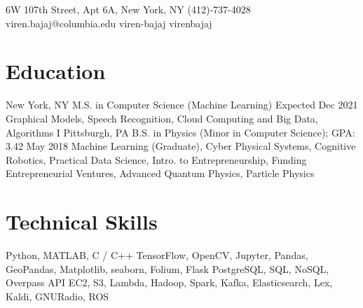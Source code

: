 \documentclass[11pt, letterpaper]{simple_resume}[2020/07/29]
\begin{document}
           {6W 107th Street, Apt 6A, New York, NY} %
           {(412)-737-4028} %
           {viren.bajaj@columbia.edu} %
           {viren-bajaj} %
           {virenbajaj} %

\section{Education}
               {New York, NY} %
               {M.S. in Computer Science (Machine Learning)} %
               {Expected Dec 2021} %
               {Graphical Models, Speech Recognition, Cloud Computing and Big Data, Algorithms I} %
\vspace{-1ex}               
               {Pittsburgh, PA} %
               {B.S. in Physics (Minor in Computer Science); GPA: 3.42} %
               {May 2018} %
               {Machine Learning (Graduate), Cyber Physical Systems, Cognitive Robotics, Practical Data Science, Intro. to Entrepreneurship, Funding Entrepreneurial Ventures, Advanced Quantum Physics, Particle Physics} %

\section{Technical Skills}

\begin{skills}
      {Python, MATLAB, C / C++}
      {TensorFlow, OpenCV, Jupyter, Pandas, GeoPandas, Matplotlib, seaborn, Folium, Flask}
       {PostgreSQL, SQL, NoSQL, Overpass API}
     {EC2, S3, Lambda, Hadoop, Spark, Kafka, Elasticsearch, Lex, Kaldi, GNURadio, ROS}
\end{skills}
\end{document}
